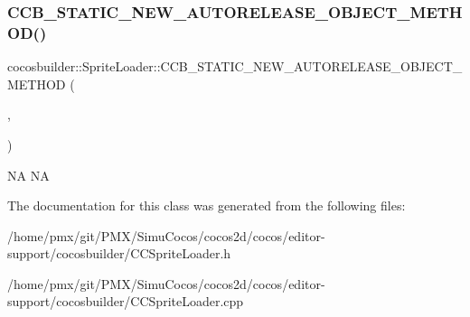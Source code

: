 \subsubsection{\texorpdfstring{C\+C\+B\+\_\+\+S\+T\+A\+T\+I\+C\+\_\+\+N\+E\+W\+\_\+\+A\+U\+T\+O\+R\+E\+L\+E\+A\+S\+E\+\_\+\+O\+B\+J\+E\+C\+T\+\_\+\+M\+E\+T\+H\+O\+D()}{CCB\_STATIC\_NEW\_AUTORELEASE\_OBJECT\_METHOD()}\hspace{0.1cm}{\footnotesize\ttfamily [2/2]}}
{\footnotesize\ttfamily cocosbuilder\+::\+Sprite\+Loader\+::\+C\+C\+B\+\_\+\+S\+T\+A\+T\+I\+C\+\_\+\+N\+E\+W\+\_\+\+A\+U\+T\+O\+R\+E\+L\+E\+A\+S\+E\+\_\+\+O\+B\+J\+E\+C\+T\+\_\+\+M\+E\+T\+H\+OD (\begin{DoxyParamCaption}\item[{\hyperlink{classcocosbuilder_1_1SpriteLoader}{Sprite\+Loader}}]{,  }\item[{loader}]{ }\end{DoxyParamCaption})}

NA  NA 

The documentation for this class was generated from the following files\+:\begin{DoxyCompactItemize}
\item 
/home/pmx/git/\+P\+M\+X/\+Simu\+Cocos/cocos2d/cocos/editor-\/support/cocosbuilder/C\+C\+Sprite\+Loader.\+h\item 
/home/pmx/git/\+P\+M\+X/\+Simu\+Cocos/cocos2d/cocos/editor-\/support/cocosbuilder/C\+C\+Sprite\+Loader.\+cpp\end{DoxyCompactItemize}
